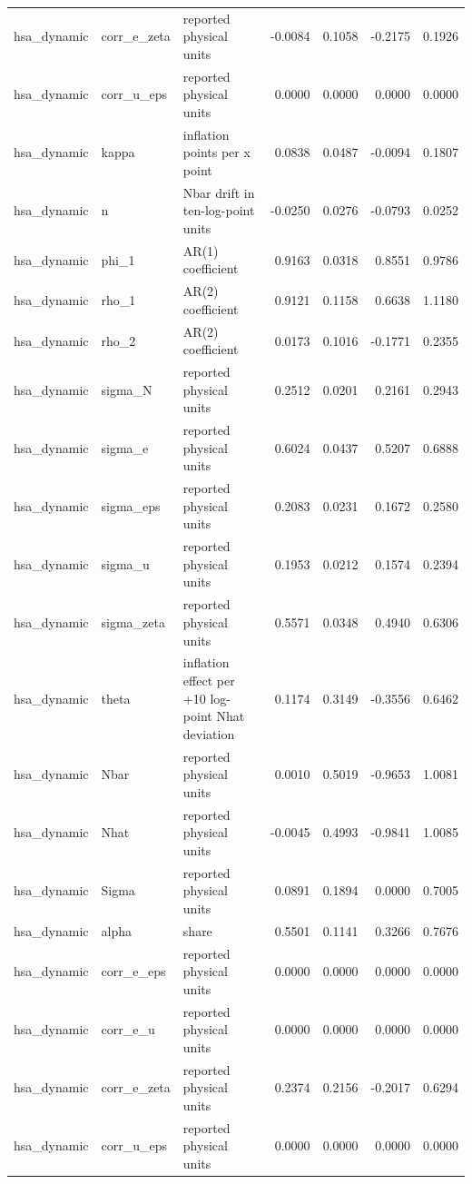 \begin{tabular}{lllrrrr}
hsa\_dynamic & corr\_e\_zeta & reported physical units & -0.0084 & 0.1058 & -0.2175 & 0.1926 \\
hsa\_dynamic & corr\_u\_eps & reported physical units & 0.0000 & 0.0000 & 0.0000 & 0.0000 \\
hsa\_dynamic & kappa & inflation points per x point & 0.0838 & 0.0487 & -0.0094 & 0.1807 \\
hsa\_dynamic & n & Nbar drift in ten-log-point units & -0.0250 & 0.0276 & -0.0793 & 0.0252 \\
hsa\_dynamic & phi\_1 & AR(1) coefficient & 0.9163 & 0.0318 & 0.8551 & 0.9786 \\
hsa\_dynamic & rho\_1 & AR(2) coefficient & 0.9121 & 0.1158 & 0.6638 & 1.1180 \\
hsa\_dynamic & rho\_2 & AR(2) coefficient & 0.0173 & 0.1016 & -0.1771 & 0.2355 \\
hsa\_dynamic & sigma\_N & reported physical units & 0.2512 & 0.0201 & 0.2161 & 0.2943 \\
hsa\_dynamic & sigma\_e & reported physical units & 0.6024 & 0.0437 & 0.5207 & 0.6888 \\
hsa\_dynamic & sigma\_eps & reported physical units & 0.2083 & 0.0231 & 0.1672 & 0.2580 \\
hsa\_dynamic & sigma\_u & reported physical units & 0.1953 & 0.0212 & 0.1574 & 0.2394 \\
hsa\_dynamic & sigma\_zeta & reported physical units & 0.5571 & 0.0348 & 0.4940 & 0.6306 \\
hsa\_dynamic & theta & inflation effect per +10 log-point Nhat deviation & 0.1174 & 0.3149 & -0.3556 & 0.6462 \\
hsa\_dynamic & Nbar & reported physical units & 0.0010 & 0.5019 & -0.9653 & 1.0081 \\
hsa\_dynamic & Nhat & reported physical units & -0.0045 & 0.4993 & -0.9841 & 1.0085 \\
hsa\_dynamic & Sigma & reported physical units & 0.0891 & 0.1894 & 0.0000 & 0.7005 \\
hsa\_dynamic & alpha & share & 0.5501 & 0.1141 & 0.3266 & 0.7676 \\
hsa\_dynamic & corr\_e\_eps & reported physical units & 0.0000 & 0.0000 & 0.0000 & 0.0000 \\
hsa\_dynamic & corr\_e\_u & reported physical units & 0.0000 & 0.0000 & 0.0000 & 0.0000 \\
hsa\_dynamic & corr\_e\_zeta & reported physical units & 0.2374 & 0.2156 & -0.2017 & 0.6294 \\
hsa\_dynamic & corr\_u\_eps & reported physical units & 0.0000 & 0.0000 & 0.0000 & 0.0000 \\

\end{tabular}
